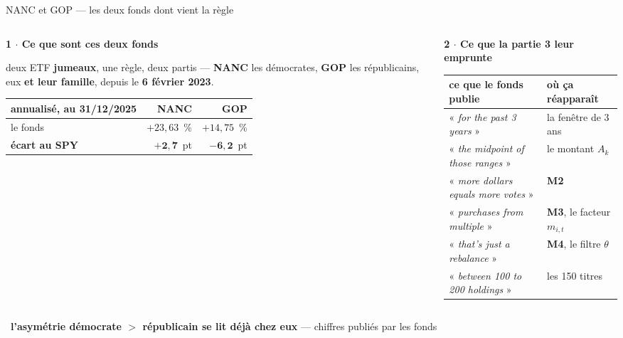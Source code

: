 \documentclass[11pt,aspectratio=169]{beamer}
\newcommand{\et}[2]{{\color{bleu}\bfseries #1 $\cdot$ #2}\par\vspace{0.6mm}}
\newcommand{\obs}[1]{{\color{bleu}\scriptsize\textbullet}~{\scriptsize #1}\par\vspace{0.4mm}}
\begin{document}
\begin{frame}{NANC et GOP --- les deux fonds dont vient la règle}
  \begin{columns}[T]
    \begin{column}{0.40\textwidth}
      \et{1}{Ce que sont ces deux fonds}
      {\scriptsize deux ETF \textbf{jumeaux}, une règle, deux partis --- \textbf{NANC} les
       démocrates, \textbf{GOP} les républicains, eux \textbf{et leur famille}, depuis le
       \textbf{6 février 2023}.}
      \par\vspace{1mm}
      {\scriptsize\setlength{\tabcolsep}{3pt}\setlength{\extrarowheight}{1.5pt}
      \begin{tabular}{@{}l r r@{}}
        \toprule
        annualisé, au 31/12/2025 & NANC & GOP\\
        \midrule
        le fonds & $+23{,}63$~\% & $+14{,}75$~\%\\
        \textbf{écart au SPY} & $\mathbf{+2{,}7}$~pt & $\mathbf{-6{,}2}$~pt\\
        \bottomrule
      \end{tabular}}
    \end{column}
    \begin{column}{0.57\textwidth}
      \et{2}{Ce que la partie 3 leur emprunte}
      {\scriptsize\setlength{\tabcolsep}{2pt}\setlength{\extrarowheight}{1.5pt}
      \begin{tabular}{@{}l l@{}}
        \toprule
        ce que le fonds publie & où ça réapparaît\\
        \midrule
        « \emph{for the past 3 years} » & la fenêtre de 3 ans\\
        « \emph{the midpoint of those ranges} » & le montant $A_k$\\
        « \emph{more dollars equals more votes} » & \textbf{M2}\\
        « \emph{purchases from multiple} » & \textbf{M3}, le facteur $m_{i,t}$\\
        « \emph{that's just a rebalance} » & \textbf{M4}, le filtre $\theta$\\
        « \emph{between 100 to 200 holdings} » & les 150 titres\\
        \bottomrule
      \end{tabular}}
    \end{column}
  \end{columns}
  \par\vspace{1mm}
  \obs{\textbf{l'asymétrie démocrate $>$ républicain se lit déjà chez eux} --- chiffres publiés
   par les fonds}
\end{frame}
\end{document}
